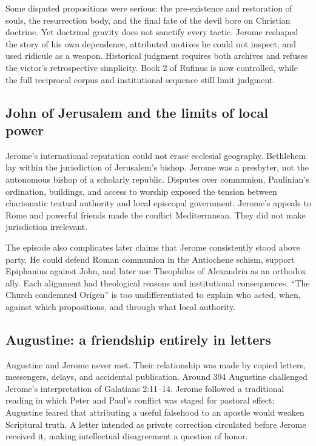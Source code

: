 Some disputed propositions were serious: the pre-existence and restoration of
souls, the resurrection body, and the final fate of the devil bore on Christian
doctrine. Yet doctrinal gravity does not sanctify every tactic. Jerome reshaped
the story of his own dependence, attributed motives he could not inspect, and
used ridicule as a weapon. Historical judgment requires both archives and
refuses the victor's retrospective simplicity. Book 2 of Rufinus is now
controlled, while the full reciprocal corpus and institutional sequence still
limit judgment.

\subsection{John of Jerusalem and the limits of local power}

Jerome's international reputation could not erase ecclesial geography.
Bethlehem lay within the jurisdiction of Jerusalem's bishop. Jerome was a
presbyter, not the autonomous bishop of a scholarly republic. Disputes over
communion, Paulinian's ordination, buildings, and access to worship exposed the
tension between charismatic textual authority and local episcopal government.
Jerome's appeals to Rome and powerful friends made the conflict Mediterranean.
They did not make jurisdiction irrelevant.

The episode also complicates later claims that Jerome consistently stood above
party. He could defend Roman communion in the Antiochene schism, support
Epiphanius against John, and later use Theophilus of Alexandria as an orthodox
ally. Each alignment had theological reasons and institutional consequences.
``The Church condemned Origen'' is too undifferentiated to explain who acted,
when, against which propositions, and through what local authority.

\subsection{Augustine: a friendship entirely in letters}

Augustine and Jerome never met. Their relationship was made by copied letters,
messengers, delays, and accidental publication. Around 394 Augustine challenged
Jerome's interpretation of Galatians 2:11--14. Jerome followed a traditional
reading in which Peter and Paul's conflict was staged for pastoral effect;
Augustine feared that attributing a useful falsehood to an apostle would weaken
Scriptural truth. A letter intended as private correction circulated before
Jerome received it, making intellectual disagreement a question of honor.

